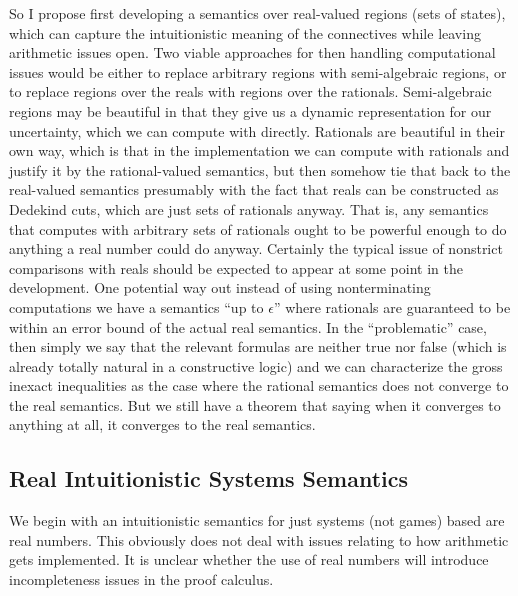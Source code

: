 \documentclass[12pt]{cmuthesis}
\theoremstyle{definition}
\theoremstyle{remark}
\begin{document}
So I propose first developing a semantics over real-valued regions (sets of states), which can capture the intuitionistic meaning of the connectives while leaving arithmetic issues open.
Two viable approaches for then handling computational issues would be either to replace arbitrary regions with semi-algebraic regions, or to replace regions over the reals with regions over the rationals.
Semi-algebraic regions may be beautiful in that they give us a dynamic representation for our uncertainty, which we can compute with directly.
Rationals are beautiful in their own way, which is that in the implementation we can compute with rationals and justify it by the rational-valued semantics, but then somehow tie that back to the real-valued semantics presumably with the fact that reals can be constructed as Dedekind cuts, which are just sets of rationals anyway.
That is, any semantics that computes with arbitrary sets of rationals ought to be powerful enough to do anything a real number could do anyway.
Certainly the typical issue of nonstrict comparisons with reals should be expected to appear at some point in the development.
One potential way out instead of using nonterminating computations we have a semantics ``up to $\epsilon$'' where rationals are guaranteed to be within an error bound of the actual real semantics.
In the ``problematic'' case, then simply we say that the relevant formulas are neither true nor false (which is already totally natural in a constructive logic) and we can characterize the gross inexact inequalities as the case where the rational semantics does not converge to the real semantics.
But we still have a theorem that saying when it converges to anything at all, it converges to the real semantics.

\subsection{Real Intuitionistic Systems Semantics}
We begin with an intuitionistic semantics for just systems (not games) based are real numbers.
This obviously does not deal with issues relating to how arithmetic gets implemented.
It is unclear whether the use of real numbers will introduce incompleteness issues in the proof calculus.
\end{document}
